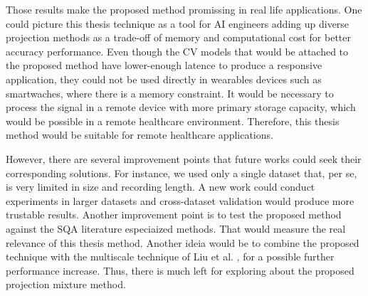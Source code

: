 Those results make the proposed method promissing in real life applications. One could picture this thesis technique as a tool for \gls{AI} engineers adding up diverse projection methods as a trade-off of memory and computational cost for better accuracy performance. Even though the \gls{CV} models that would be attached to the proposed method have lower-enough latence to produce a responsive application, they could not be used directly in wearables devices such as smartwaches, where there is a memory constraint. It would be necessary to process the signal in a remote device with more primary storage capacity, which would be possible in a remote healthcare environment. Therefore, this thesis method would be suitable for remote healthcare applications.	 

However, there are several improvement points that future works could seek their corresponding solutions. For instance, we used only a single dataset that, per se, is very limited in size and recording length. A new work could conduct experiments in larger datasets and cross-dataset validation would produce more trustable results. Another improvement point is to test the proposed method against the SQA literature especiaized methods. That would measure the real relevance of this thesis method. Another ideia would be to combine the proposed technique with the multiscale technique of Liu et al. \cite{imaging-6}, for a possible further performance increase. Thus, there is much left for exploring about the proposed projection mixture method.

